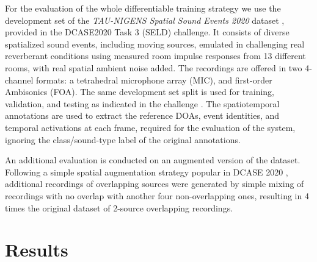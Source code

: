 \documentclass[conference]{IEEEtran}
\begin{document}
For the evaluation of the whole differentiable training strategy we use the development set of the \emph{TAU-NIGENS Spatial Sound Events 2020} dataset \cite{politis2020dataset}, provided in the DCASE2020 Task 3 (SELD) challenge. It consists of diverse spatialized sound events, including moving sources, emulated in challenging real reverberant conditions using measured room impulse responses from 13 different rooms, with real spatial ambient noise added. The recordings are offered in two 4-channel formats: a tetrahedral microphone array (MIC), and first-order Ambisonics (FOA). The same development set split is used for training, validation, and testing as indicated in the challenge \cite{politis2020dataset}. The spatiotemporal annotations are used to extract the reference DOAs, event identities, and temporal activations at each frame, required for the evaluation of the system, ignoring the class/sound-type label of the original annotations.

An additional evaluation is conducted on an augmented version of the dataset. Following a simple spatial augmentation strategy popular in DCASE 2020 \cite{Du2020_task3_report}, additional recordings of overlapping sources were generated by simple mixing of recordings with no overlap with another four non-overlapping ones, resulting in 4 times the original dataset of 2-source overlapping recordings.



\section{Results}
\end{document}

